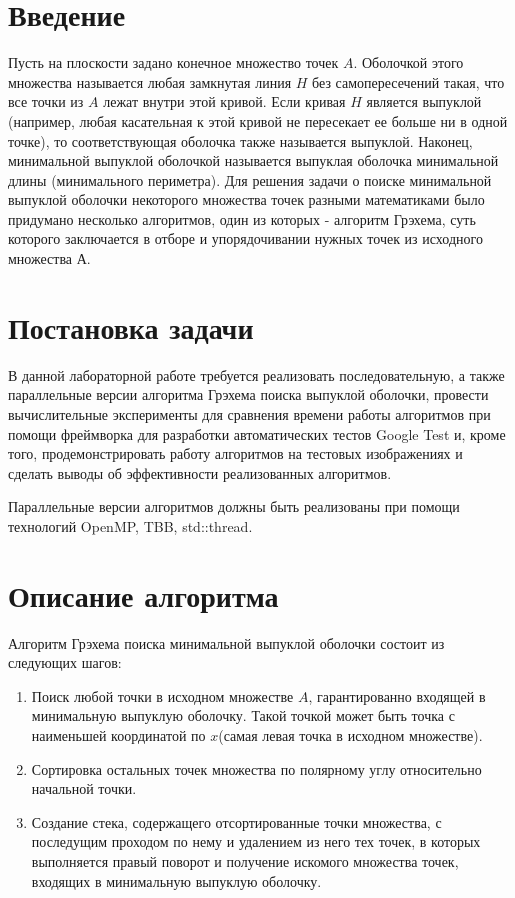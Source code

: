 \documentclass{report}
\begin{document}
\setcounter{page}{2}

\tableofcontents
\newpage

\section*{Введение}
\par Пусть на плоскости задано конечное множество точек $A$. Оболочкой этого множества называется любая замкнутая линия $H$ без самопересечений такая, что все точки из $A$ лежат внутри этой кривой. Если кривая $H$ является выпуклой (например, любая касательная к этой кривой не пересекает ее больше ни в одной точке), то соответствующая оболочка также называется выпуклой. Наконец, минимальной выпуклой оболочкой называется выпуклая оболочка минимальной длины (минимального периметра). Для решения задачи о поиске минимальной выпуклой оболочки некоторого множества точек разными математиками было придумано несколько алгоритмов, один из которых - алгоритм Грэхема, суть которого заключается в отборе и упорядочивании нужных точек из исходного множества $А$.
\newpage

\section*{Постановка задачи}
\par В данной лабораторной работе требуется реализовать последовательную, а также параллельные версии алгоритма Грэхема поиска выпуклой оболочки, провести вычислительные эксперименты для сравнения времени работы алгоритмов при помощи фреймворка для разработки автоматических тестов Google Test и, кроме того, продемонстрировать работу алгоритмов на тестовых изображениях и сделать выводы об эффективности реализованных алгоритмов.
\par Параллельные версии алгоритмов должны быть реализованы при помощи технологий OpenMP, TBB, std::thread.
\newpage

\section*{Описание алгоритма}
\par Алгоритм Грэхема поиска минимальной выпуклой оболочки состоит из следующих шагов:
\begin{enumerate}
\item Поиск любой точки в исходном множестве $A$, гарантированно входящей в минимальную выпуклую оболочку. Такой точкой может быть точка с наименьшей координатой по $x$(самая левая точка в исходном множестве).
\item Сортировка остальных точек множества по полярному углу относительно начальной точки.
\item Создание стека, содержащего отсортированные точки множества, с последущим проходом по нему и удалением из него тех точек, в которых выполняется правый поворот и получение искомого множества точек, входящих в минимальную выпуклую оболочку.
\end{enumerate}
\newpage
\end{document}
